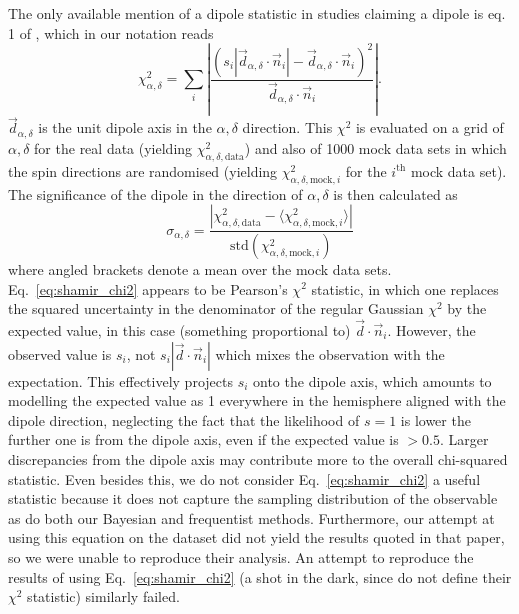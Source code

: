 \documentclass[fleqn,usenatbib,nofootinbib]{mnras}
\begin{document}
The only available mention of a dipole statistic in studies claiming a dipole is eq. 1 of \citet{McAdam_Shamir_2023_GAN}, which in our notation reads
\begin{equation}
\label{eq:shamir_chi2}
\chi^2_{\alpha,\delta} = \sum_i \left|\frac{\left(s_i |\vec{d}_{\alpha,\delta} \cdot \vec{n}_i| - \vec{d}_{\alpha,\delta} \cdot \vec{n}_i\right)^2}{\vec{d}_{\alpha,\delta} \cdot \vec{n}_i}\right|.
\end{equation}
$\vec{d}_{\alpha,\delta}$ is the unit dipole axis in the $\alpha,\delta$ direction. This $\chi^2$ is evaluated on a grid of $\alpha, \delta$ for the real data (yielding $\chi^2_{\alpha,\delta,\text{data}}$) and also of 1000 mock data sets in which the spin directions are randomised (yielding $\chi^2_{\alpha,\delta,\text{mock},i}$ for the $i^\text{th}$ mock data set). The significance of the dipole in the direction of $\alpha, \delta$ is then calculated as
\begin{equation}
\sigma_{\alpha,\delta} = \frac{|\chi^2_{\alpha,\delta,\text{data}} - \langle{\chi^2_{\alpha,\delta,\text{mock},i}}\rangle|}{\text{std}(\chi^2_{\alpha,\delta,\text{mock},i})}
\end{equation}
where angled brackets denote a mean over the mock data sets. Eq.~\ref{eq:shamir_chi2} appears to be Pearson's $\chi^2$ statistic, in which one replaces the squared uncertainty in the denominator of the regular Gaussian $\chi^2$ by the expected value, in this case (something proportional to) $\vec{d} \cdot \vec{n}_i$.
However, the observed value is $s_i$, not $s_i |\vec{d} \cdot \vec{n}_i|$ which mixes the observation with the expectation. This effectively projects $s_i$ onto the dipole axis, which amounts to modelling the expected value as 1 everywhere in the hemisphere aligned with the dipole direction, neglecting the fact that the likelihood of $s=1$ is lower the further one is from the dipole axis, even if the expected value is $>0.5$. Larger discrepancies from the dipole axis may contribute more to the overall chi-squared statistic. Even besides this, we do not consider Eq.~\ref{eq:shamir_chi2} a useful statistic because it does not capture the sampling distribution of the observable as do both our Bayesian and frequentist methods. Furthermore, our attempt at using this equation on the \citet{McAdam_Shamir_2023_GAN} dataset did not yield the results quoted in that paper, so we were unable to reproduce their analysis. An attempt to reproduce the results of \citet{Longo} using Eq.~\ref{eq:shamir_chi2} (a shot in the dark, since \citealt{Longo} do not define their $\chi^2$ statistic) similarly failed.
\end{document}
